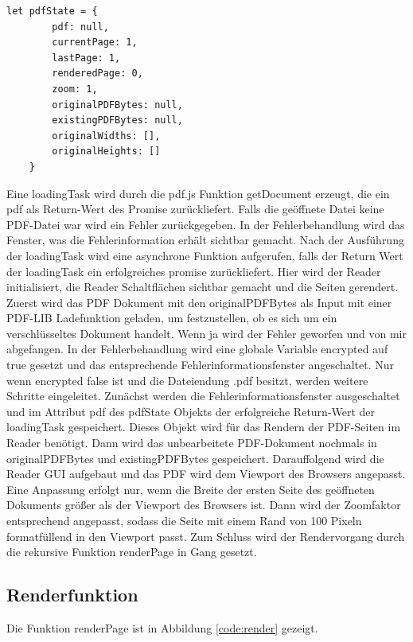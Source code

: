 \begin{lstlisting}[style=ES6, caption={Objekt für ein geöffnetes PDF-Dokument}, label=code:pdfstate, breaklines=true]
	let pdfState = {
		pdf: null,
		currentPage: 1,
		lastPage: 1,
		renderedPage: 0,
		zoom: 1,
		originalPDFBytes: null,
		existingPDFBytes: null,
		originalWidths: [],
		originalHeights: []
	}
\end{lstlisting} 

Eine loadingTask wird durch die pdf.js Funktion getDocument erzeugt, die ein pdf als Return-Wert des Promise zurückliefert. Falls die geöffnete Datei keine PDF-Datei war wird ein Fehler zurückgegeben. In der Fehlerbehandlung wird das Fenster, was die Fehlerinformation erhält sichtbar gemacht. Nach der Ausführung der loadingTask wird eine asynchrone Funktion aufgerufen, falls der Return Wert der loadingTask ein erfolgreiches promise zurückliefert. Hier wird der Reader initialisiert, die Reader Schaltflächen sichtbar gemacht und die Seiten gerendert. Zuerst wird das PDF Dokument mit den originalPDFBytes als Input mit einer PDF-LIB Ladefunktion geladen, um festzustellen, ob es sich um ein verschlüsseltes Dokument handelt. Wenn ja wird der Fehler geworfen und von mir abgefangen. In der Fehlerbehandlung wird eine globale Variable encrypted auf true gesetzt und das entsprechende Fehlerinformationsfenster angeschaltet. Nur wenn encrypted false ist und die Dateiendung .pdf besitzt, werden weitere Schritte eingeleitet. Zunächst werden die Fehlerinformationsfenster ausgeschaltet und im Attribut pdf des pdfState Objekts der erfolgreiche Return-Wert der loadingTask gespeichert. Dieses Objekt wird für das Rendern der PDF-Seiten im Reader benötigt. Dann wird das unbearbeitete PDF-Dokument nochmals in originalPDFBytes und existingPDFBytes gespeichert. Darauffolgend wird die Reader GUI aufgebaut und das PDF wird dem Viewport des Browsers angepasst. Eine Anpassung erfolgt nur, wenn die Breite der ersten Seite des geöffneten Dokuments größer als der Viewport des Browsers ist. Dann wird der Zoomfaktor entsprechend angepasst, sodass die Seite mit einem Rand von 100 Pixeln formatfüllend in den Viewport passt. Zum Schluss wird der Rendervorgang durch die rekursive Funktion renderPage in Gang gesetzt.

\subsection{Renderfunktion}
Die Funktion renderPage ist in Abbildung \ref{code:render} gezeigt.

